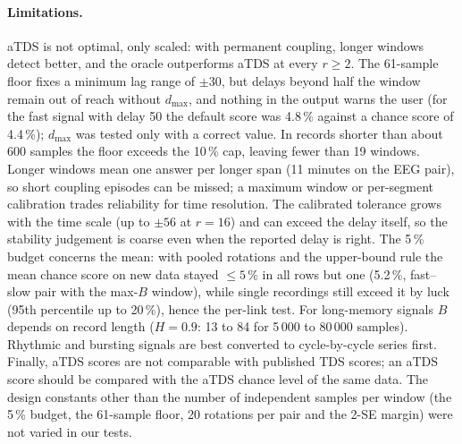 \documentclass[11pt,a4paper]{article}
\begin{document}
\paragraph{Limitations.} aTDS is not optimal, only scaled: with permanent coupling, longer windows detect better, and the oracle outperforms aTDS at every $r \ge 2$. The 61-sample floor fixes a minimum lag range of $\pm30$, but delays beyond half the window remain out of reach without $d_{\max}$, and nothing in the output warns the user (for the fast signal with delay 50 the default score was 4.8\,\% against a chance score of 4.4\,\%); $d_{\max}$ was tested only with a correct value. In records shorter than about 600 samples the floor exceeds the 10\,\% cap, leaving fewer than 19 windows. Longer windows mean one answer per longer span (11 minutes on the EEG pair), so short coupling episodes can be missed; a maximum window or per-segment calibration trades reliability for time resolution. The calibrated tolerance grows with the time scale (up to $\pm56$ at $r = 16$) and can exceed the delay itself, so the stability judgement is coarse even when the reported delay is right. The 5\,\% budget concerns the mean: with pooled rotations and the upper-bound rule the mean chance score on new data stayed $\le 5\,\%$ in all rows but one (5.2\,\%, fast--slow pair with the max-$B$ window), while single recordings still exceed it by luck (95th percentile up to 20\,\%), hence the per-link test. For long-memory signals $B$ depends on record length ($H = 0.9$: 13 to 84 for 5\,000 to 80\,000 samples). Rhythmic and bursting signals are best converted to cycle-by-cycle series first. Finally, aTDS scores are not comparable with published TDS scores; an aTDS score should be compared with the aTDS chance level of the same data. The design constants other than the number of independent samples per window (the 5\,\% budget, the 61-sample floor, 20 rotations per pair and the 2-SE margin) were not varied in our tests.
\end{document}
